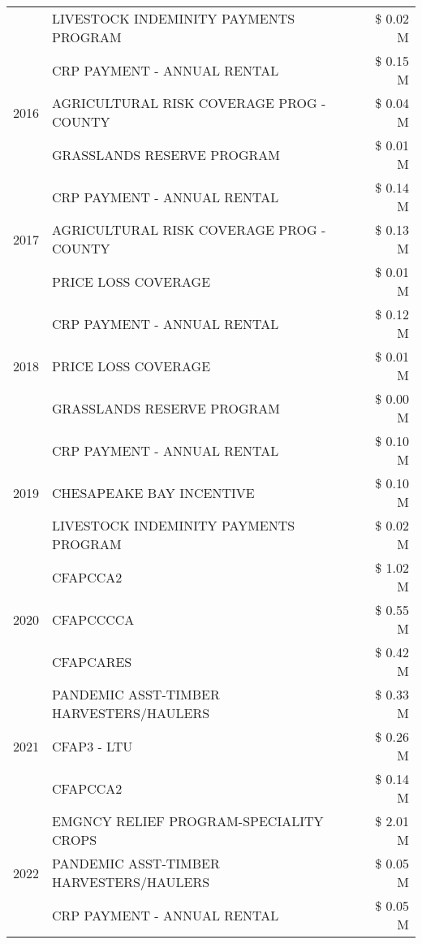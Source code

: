 \begin{tabular}{llr}
 & LIVESTOCK INDEMINITY PAYMENTS PROGRAM & \$ 0.02 M \\
\cline{1-3}
\multirow[t]{3}{*}{2016} & CRP PAYMENT - ANNUAL RENTAL & \$ 0.15 M \\
 & AGRICULTURAL RISK COVERAGE PROG - COUNTY & \$ 0.04 M \\
 & GRASSLANDS RESERVE PROGRAM & \$ 0.01 M \\
\cline{1-3}
\multirow[t]{3}{*}{2017} & CRP PAYMENT - ANNUAL RENTAL & \$ 0.14 M \\
 & AGRICULTURAL RISK COVERAGE PROG - COUNTY & \$ 0.13 M \\
 & PRICE LOSS COVERAGE & \$ 0.01 M \\
\cline{1-3}
\multirow[t]{3}{*}{2018} & CRP PAYMENT - ANNUAL RENTAL & \$ 0.12 M \\
 & PRICE LOSS COVERAGE & \$ 0.01 M \\
 & GRASSLANDS RESERVE PROGRAM & \$ 0.00 M \\
\cline{1-3}
\multirow[t]{3}{*}{2019} & CRP PAYMENT - ANNUAL RENTAL & \$ 0.10 M \\
 & CHESAPEAKE BAY INCENTIVE & \$ 0.10 M \\
 & LIVESTOCK INDEMINITY PAYMENTS PROGRAM & \$ 0.02 M \\
\cline{1-3}
\multirow[t]{3}{*}{2020} & CFAPCCA2 & \$ 1.02 M \\
 & CFAPCCCCA & \$ 0.55 M \\
 & CFAPCARES & \$ 0.42 M \\
\cline{1-3}
\multirow[t]{3}{*}{2021} & PANDEMIC ASST-TIMBER HARVESTERS/HAULERS & \$ 0.33 M \\
 & CFAP3 - LTU & \$ 0.26 M \\
 & CFAPCCA2 & \$ 0.14 M \\
\cline{1-3}
\multirow[t]{3}{*}{2022} & EMGNCY RELIEF PROGRAM-SPECIALITY CROPS & \$ 2.01 M \\
 & PANDEMIC ASST-TIMBER HARVESTERS/HAULERS & \$ 0.05 M \\
 & CRP PAYMENT - ANNUAL RENTAL & \$ 0.05 M \\
\cline{1-3}
\bottomrule
\end{tabular}
